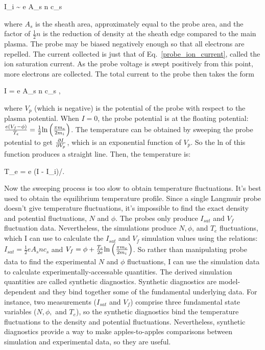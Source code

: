 \beq
\label{probe_ion_current}
I_i \sim {} e A_s n c_s
\eeq

where $A_s$ is the sheath area, approximately equal to the probe area, and the factor of $\frac{1}{2} n$ is the reduction of density at the sheath edge compared to the main plasma.
The probe may be biased negatively enough so that all electrons are repelled. The current collected is just that of Eq.~\ref{probe_ion_current}, called the ion saturation current.
As the probe voltage is swept positively from this point, more electrons are collected. The total current to the probe then takes the form~\cite{hutchinson2002}

\beq
\label{probe_current}
I = e A_s n c_s ,
\eeq

where $V_p$ (which is negative) is the potential of the probe with respect to the plasma potential. When $I=0$, the probe potential is at the floating potential: 
$\frac{e (V_f - \phi)}{T_e} = \frac{1}{2} {\rm ln} \left(\frac{\pi m_e}{2 m_i}\right)$. The temperature can be obtained by sweeping the probe potential to get $\frac{\partial I}{\partial V_p}$, 
which is an exponential function of $V_p$.
So the ln of this function produces a straight line. Then, the temperature is:

\beq
\label{probe_temp}
T_e = e (I - I_i)/.
\eeq

Now the sweeping process is too slow to obtain temperature fluctuations. It's best used to obtain the equilibrium temperature profile. Since a single Langmuir probe doesn't give
temperature fluctuations, it's impossible to find the exact density and potential fluctuations, $N$ and $\phi$. The probes only produce $I_{sat}$ and $V_f$ fluctuation data.
Nevertheless, the simulations produce $N, \phi$, and $T_e$
fluctuations, which I can use to calculate the $I_{sat}$ and $V_f$ simulation values using the relations: $I_{sat} = \frac{1}{2} e A_s n c_s$ and
$V_f = \phi + \frac{T_e}{2 e} {\rm ln} \left(\frac{\pi m_e}{2 m_i}\right)$. So rather than manipulating probe data to find the experimental $N$ and $\phi$ fluctuations, I can
use the simulation data to calculate experimentally-accessable quantities. The derived simulation quantities are called synthetic diagnostics. 
Synthetic diagnostics are model-dependent and they bind together some of the fundamental
underlying data. For instance, two measurements ($I_{sat}$ and $V_f$) comprise three fundamental state variables ($N, \phi,$ and $T_e$), so the synthetic diagnostics bind the temperature fluctuations
to the density and potential fluctuations. Nevertheless, synthetic diagnostics provide a way to make
apples-to-apples comparisons between simulation and experimental data, so they are useful.


